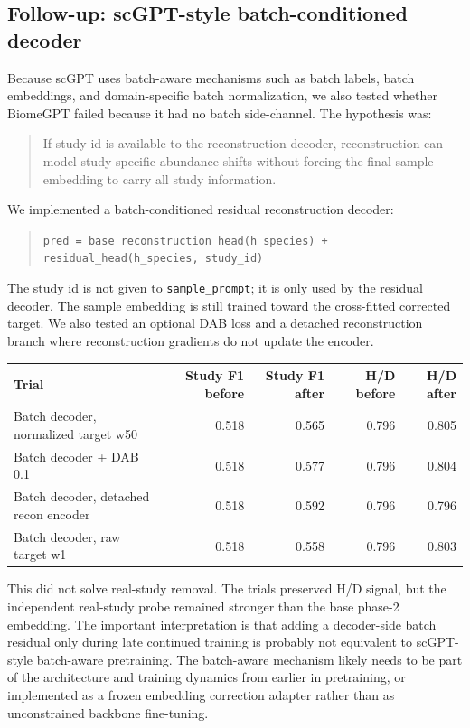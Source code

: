 \documentclass[11pt]{article}
\newcommand{\code}[1]{\texttt{\small #1}}
\begin{document}
\subsection{Follow-up: scGPT-style batch-conditioned decoder}

Because scGPT uses batch-aware mechanisms such as batch labels, batch embeddings, and
domain-specific batch normalization, we also tested whether BiomeGPT failed because it had
no batch side-channel. The hypothesis was:

\begin{quote}
If study id is available to the reconstruction decoder, reconstruction can model
study-specific abundance shifts without forcing the final sample embedding to carry all
study information.
\end{quote}

We implemented a batch-conditioned residual reconstruction decoder:

\begin{quote}
\code{pred = base\_reconstruction\_head(h\_species) + residual\_head(h\_species, study\_id)}
\end{quote}

The study id is not given to \code{sample\_prompt}; it is only used by the residual
decoder. The sample embedding is still trained toward the cross-fitted corrected target.
We also tested an optional DAB loss and a detached reconstruction branch where
reconstruction gradients do not update the encoder.

\begin{center}
\begin{tabular}{lrrrr}
\toprule
Trial & Study F1 before & Study F1 after & H/D before & H/D after \\
\midrule
Batch decoder, normalized target w50 & 0.518 & 0.565 & 0.796 & 0.805 \\
Batch decoder + DAB 0.1 & 0.518 & 0.577 & 0.796 & 0.804 \\
Batch decoder, detached recon encoder & 0.518 & 0.592 & 0.796 & 0.796 \\
Batch decoder, raw target w1 & 0.518 & 0.558 & 0.796 & 0.803 \\
\bottomrule
\end{tabular}
\end{center}

This did not solve real-study removal. The trials preserved H/D signal, but the
independent real-study probe remained stronger than the base phase-2 embedding. The
important interpretation is that adding a decoder-side batch residual only during late
continued training is probably not equivalent to scGPT-style batch-aware pretraining.
The batch-aware mechanism likely needs to be part of the architecture and training
dynamics from earlier in pretraining, or implemented as a frozen embedding correction
adapter rather than as unconstrained backbone fine-tuning.
\end{document}
